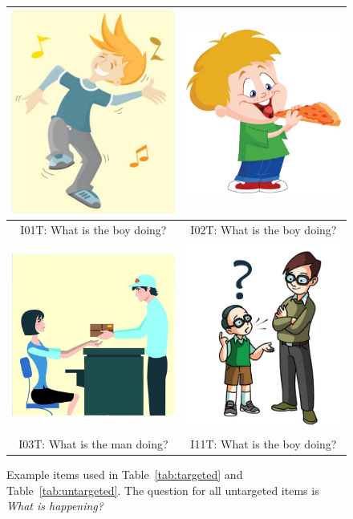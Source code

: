 \documentclass[12pt,notitlepage]{article}
\begin{document}
\begin{figure}[h]
\begin{center}
\begin{tabular}{|c|c|}
\hline
\includegraphics[width=0.35\columnwidth,trim=0 0 0 -3]{figures/I01.jpg} & \includegraphics[width=0.35\columnwidth,trim=0 0 0 -3]{figures/I02.jpg}\\
\hline
I01T: What is the boy doing? & I02T: What is the boy doing? \\
\hline
\hline
\includegraphics[width=0.35\columnwidth,trim=0 0 0 -3]{figures/I03.jpg} & \includegraphics[width=0.35\columnwidth,trim=0 0 0 -3]{figures/I11.jpg}\\
\hline
I03T: What is the man doing? & I11T: What is the boy doing? \\
\hline
\end{tabular}
\end{center}
\caption{Example items used in Table~\ref{tab:targeted} and Table~\ref{tab:untargeted}. The question for all untargeted items is \textit{What is happening?}}
\label{fig:appendix1}
\end{figure}
\end{document}
